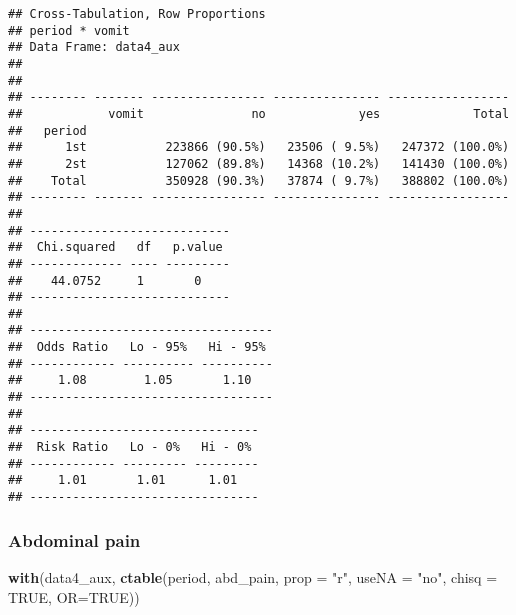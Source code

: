 \documentclass[
]{article}
\newenvironment{Shaded}{\begin{snugshade}}{\end{snugshade}}
\newcommand{\DataTypeTok}[1]{\textcolor[rgb]{0.13,0.29,0.53}{#1}}
\newcommand{\KeywordTok}[1]{\textcolor[rgb]{0.13,0.29,0.53}{\textbf{#1}}}
\newcommand{\NormalTok}[1]{#1}
\newcommand{\OtherTok}[1]{\textcolor[rgb]{0.56,0.35,0.01}{#1}}
\newcommand{\StringTok}[1]{\textcolor[rgb]{0.31,0.60,0.02}{#1}}
\begin{document}
\begin{verbatim}
## Cross-Tabulation, Row Proportions  
## period * vomit  
## Data Frame: data4_aux  
## 
## 
## -------- ------- ---------------- --------------- -----------------
##            vomit               no             yes             Total
##   period                                                           
##      1st           223866 (90.5%)   23506 ( 9.5%)   247372 (100.0%)
##      2st           127062 (89.8%)   14368 (10.2%)   141430 (100.0%)
##    Total           350928 (90.3%)   37874 ( 9.7%)   388802 (100.0%)
## -------- ------- ---------------- --------------- -----------------
## 
## ----------------------------
##  Chi.squared   df   p.value 
## ------------- ---- ---------
##    44.0752     1       0    
## ----------------------------
## 
## ----------------------------------
##  Odds Ratio   Lo - 95%   Hi - 95% 
## ------------ ---------- ----------
##     1.08        1.05       1.10   
## ----------------------------------
## 
## --------------------------------
##  Risk Ratio   Lo - 0%   Hi - 0% 
## ------------ --------- ---------
##     1.01       1.01      1.01   
## --------------------------------
\end{verbatim}

\hypertarget{abdominal-pain-1}{%
\subsubsection{Abdominal pain}\label{abdominal-pain-1}}

\begin{Shaded}
\begin{Highlighting}[]
\KeywordTok{with}\NormalTok{(data4_aux, }\KeywordTok{ctable}\NormalTok{(period, abd_pain, }\DataTypeTok{prop =} \StringTok{"r"}\NormalTok{, }\DataTypeTok{useNA =} \StringTok{"no"}\NormalTok{, }\DataTypeTok{chisq =} \OtherTok{TRUE}\NormalTok{, }\DataTypeTok{OR=}\OtherTok{TRUE}\NormalTok{))}
\end{Highlighting}
\end{Shaded}
\end{document}
